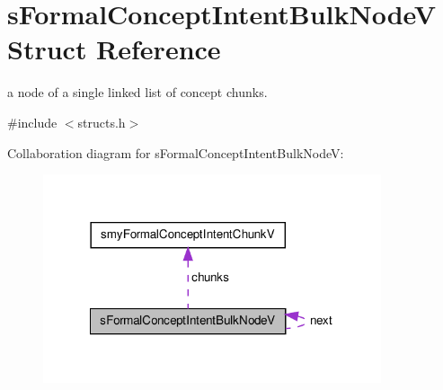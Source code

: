 \hypertarget{structsFormalConceptIntentBulkNodeV}{\section{s\-Formal\-Concept\-Intent\-Bulk\-Node\-V \-Struct \-Reference}
\label{structsFormalConceptIntentBulkNodeV}
}


a node of a single linked list of concept chunks.  




{\ttfamily \#include $<$structs.\-h$>$}



\-Collaboration diagram for s\-Formal\-Concept\-Intent\-Bulk\-Node\-V\-:\nopagebreak
\begin{figure}[H]
\begin{center}
\leavevmode
\includegraphics[width=282pt]{structsFormalConceptIntentBulkNodeV__coll__graph}
\end{center}
\end{figure}
